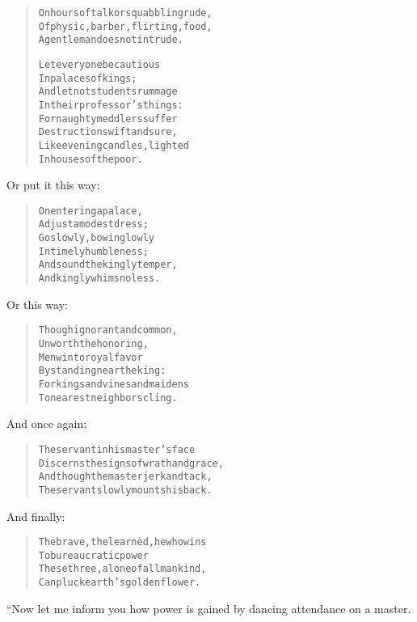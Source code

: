 \documentclass[article, twoside, 14pt]{memoir}
\renewenvironment{verbatim}{%
\begin{quote}%
\vskip -10pt%
\begin{alltt}\normalfont\large}{\end{alltt}%
\end{quote}%
\vskip -10pt
} %
\begin{document}
\begin{verbatim}
On hours of talk or squabbling rude,
Of physic, barber, flirting, food,
A gentleman does not intrude.

Let everyone be cautious
    In palaces of kings;
And let not students rummage
    In their professor's things:
For naughty meddlers suffer
    Destruction swift and sure,
Like evening candles, lighted
    In houses of the poor.
\end{verbatim}
Or put it this way:

\begin{verbatim}
On entering a palace,
    Adjust a modest dress;
Go slowly, bowing lowly
    In timely humbleness;
And sound the kingly temper,
    And kingly whims no less.
\end{verbatim}
Or this way:

\begin{verbatim}
Though ignorant and common,
    Unworth the honoring,
Men win to royal favor
    By standing near the king:
For kings and vines and maidens
    To nearest neighbors cling.
\end{verbatim}
And once again:

\begin{verbatim}
The servant in his master's face
Discerns the signs of wrath and grace,
And though the master jerk and tack,
The servant slowly mounts his back.
\end{verbatim}
And finally:

\begin{verbatim}
The brave, the learnèd, he who wins
    To bureaucratic power
These three, alone of all mankind,
    Can pluck earth's golden flower.
\end{verbatim}
“Now let me inform you how power is gained by dancing attendance on
a master.
\end{document}
